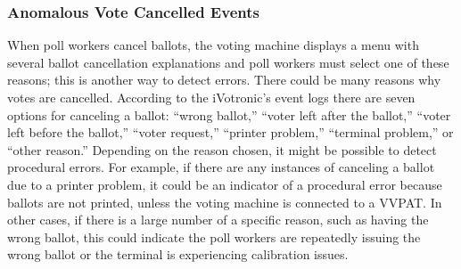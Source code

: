 \subsubsection{Anomalous Vote Cancelled Events}
When poll workers cancel ballots, the voting machine displays a menu with several ballot cancellation explanations and poll workers must select one of these reasons; this is another way to detect errors. There could be many reasons why votes are cancelled. According to the iVotronic’s event logs there are seven options for canceling a ballot: \textquotedblleft wrong ballot,\textquotedblright \hspace{1 mm} \textquotedblleft voter left after the ballot,\textquotedblright \hspace{1 mm}  \textquotedblleft voter left before the ballot,\textquotedblright \hspace{1 mm}  \textquotedblleft voter request,\textquotedblright \hspace{1 mm}  \textquotedblleft printer problem,\textquotedblright \hspace{1 mm}  \textquotedblleft terminal problem,\textquotedblright \hspace{1 mm}  or \textquotedblleft other reason.\textquotedblright \hspace{2 mm}  Depending on the reason chosen, it might be possible to detect procedural errors.  For example, if there are any instances of canceling a ballot due to a printer problem, it could be an indicator of a procedural error because ballots are not printed, unless the voting machine is connected to a VVPAT. In other cases, if there is a large number of a specific reason, such as having the wrong ballot, this could indicate the poll workers are repeatedly issuing the wrong ballot or the terminal is experiencing calibration issues.  

